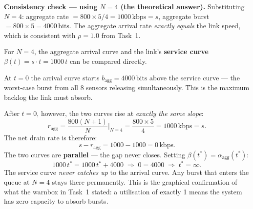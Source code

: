\documentclass[12pt, a4paper]{article}
\begin{document}
\begin{notebox}
  \textbf{Consistency check --- using $N = 4$ (the theoretical answer).}
  Substituting $N = 4$: aggregate rate $= 800 \times 5/4 = 1000\,\mathrm{kbps} = s$,
  aggregate burst $= 800 \times 5 = 4000\,\mathrm{bits}$.
  The aggregate arrival rate \emph{exactly equals} the link speed, which is
  consistent with $\rho = 1.0$ from Task~1.
\end{notebox}

\vspace{4pt}
For $N = 4$, the aggregate arrival curve and the link's \textbf{service curve}
$\beta(t) = s \cdot t = 1000\,t$ can be compared directly.

At $t = 0$ the arrival curve starts $b_\text{agg} = 4000\,\mathrm{bits}$ above
the service curve --- the worst-case burst from all 8 sensors releasing
simultaneously.
This is the maximum backlog the link must absorb.

After $t = 0$, however, the two curves rise at \emph{exactly the same slope}:
\[
  r_\text{agg} = \frac{800(N+1)}{N}\Big|_{N=4} = \frac{800 \times 5}{4}
  = 1000\,\mathrm{kbps} = s.
\]
The net drain rate is therefore:
\[
  s - r_\text{agg} = 1000 - 1000 = 0\,\mathrm{kbps}.
\]
The two curves are \textbf{parallel} --- the gap never closes.
Setting $\beta(t^*) = \alpha_\text{agg}(t^*)$:
\[
  1000\,t^* = 1000\,t^* + 4000
  \;\Longrightarrow\;
  0 = 4000
  \;\Longrightarrow\;
  \boxed{t^* = \infty.}
\]
The service curve \emph{never catches up} to the arrival curve.
Any burst that enters the queue at $N = 4$ stays there permanently.
This is the graphical confirmation of what the warnbox in Task~1 stated: a
utilisation of exactly 1 means the system has zero capacity to absorb bursts.
\end{document}
